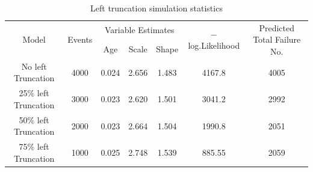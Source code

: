 \documentclass[12pt,letterpaper]{article}
\begin{document}
\begin{table}[h!]
	\renewcommand{\arraystretch}{1.5}
	\small
	\centering
	\caption{Left truncation simulation statistics}
	\begin{tabular}{ccccccc}
		\hline
		\multirow{2}[4]{*}{Model} & \multirow{2}[4]{*}{Events} & \multicolumn{3}{c}{Variable Estimates} & \multirow{2}{3cm}{$-$ log.Likelihood} & \multirow{2}{3cm}{Predicted Total Failure No.}  \\
		\cline{3-5} %
		&       & Age   & Scale & Shape &  &\\				
		\hline
		No left Truncation & 4000  & 0.024 & 2.656 & 1.483 & 4167.8  &4005\\
		25\%  left Truncation & 3000  & 0.023 & 2.620  & 1.501 & 3041.2 & 2992\\
		50\%  left Truncation & 2000  & 0.023 & 2.664 & 1.504 & 1990.8 & 2051\\
		75\%  left Truncation & 1000  & 0.025 & 2.748 & 1.539 & 885.55 &2059\\
		\hline
	\end{tabular}%
	\label{tab:lefttruncation}%
\end{table}%
\end{document}
